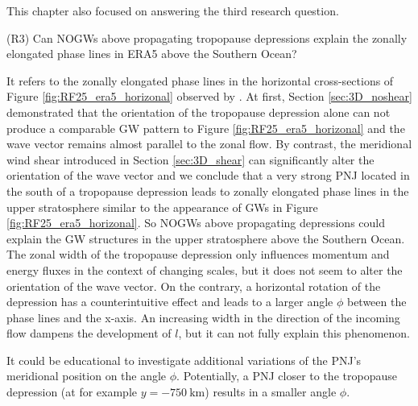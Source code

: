 This chapter also focused on answering the third research question.
\begin{tcolorbox}[]
    (R3) Can NOGWs above propagating tropopause depressions explain the zonally elongated phase lines in ERA5 above the Southern Ocean?
\end{tcolorbox}
It refers to the zonally elongated phase lines in the horizontal cross-sections of Figure \ref{fig:RF25_era5_horizonal} observed by \textcite[]{dornbrack_stratospheric_2022}. At first, Section \ref{sec:3D_noshear} demonstrated that the orientation of the tropopause depression alone can not produce a comparable GW pattern to Figure \ref{fig:RF25_era5_horizonal} and the wave vector remains almost parallel to the zonal flow. By contrast, the meridional wind shear introduced in Section \ref{sec:3D_shear} can significantly alter the orientation of the wave vector and we conclude that a very strong PNJ located in the south of a tropopause depression leads to zonally elongated phase lines in the upper stratosphere similar to the appearance of GWs in Figure \ref{fig:RF25_era5_horizonal}. So NOGWs above propagating depressions could explain the GW structures in the upper stratosphere above the Southern Ocean. \\
The zonal width of the tropopause depression only influences momentum and energy fluxes in the context of changing scales, but it does not seem to alter the orientation of the wave vector. On the contrary, a horizontal rotation of the depression has a counterintuitive effect and leads to a larger angle $\phi$ between the phase lines and the x-axis. An increasing width in the direction of the incoming flow dampens the development of $l$, but it can not fully explain this phenomenon.   

It could be educational to investigate additional variations of the PNJ's meridional position on the angle $\phi$. Potentially, a PNJ closer to the tropopause depression (at for example $y=\SI{-750}{\kilo\meter}$) results in a smaller angle $\phi$.


